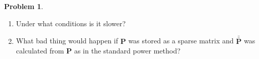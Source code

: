 \documentclass[10pt]{article}
\theoremstyle{definition}
\newtheorem{problem}{Problem}
\newcommand{\p}{\mathbf P}
\newcommand{\pb}{\bar {\p}}
\newcommand{\pbb}{\bar {\pb}}
\begin{document}
\begin{problem}
\begin{enumerate}
        \item
            Under what conditions is it slower?
            \vspace{3in}

        \item
            What bad thing would happen if $\p$ was stored as a sparse matrix and $\pbb$ was calculated from $\p$ as in the standard power method?
            \vspace{4in}

    \end{enumerate}
\end{problem}
\end{document}
